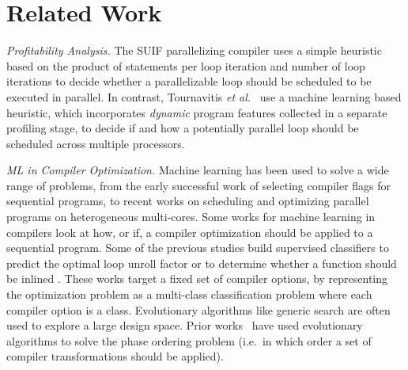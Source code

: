
\section{Related Work}
\label{related_work}


\textit{Profitability Analysis.}
The SUIF \cite{Wilson:1994:SIR:193209.193217} parallelizing compiler uses a simple heuristic based on the product of statements per loop iteration and number of loop iterations to decide whether a parallelizable loop should be scheduled to be executed in parallel. In contrast, Tournavitis \emph{et al.}~\cite{Tournavitis:2009:THA:1542476.1542496} use a machine learning based heuristic, which incorporates \textit{dynamic} program features collected in a separate profiling stage, to decide if and how a potentially parallel loop should be scheduled across multiple processors.

\textit{ML in Compiler Optimization.}
Machine learning has been used to solve a wide range of problems, from the early successful work of selecting compiler flags for sequential programs, to recent works on scheduling and optimizing parallel programs on heterogeneous multi-cores. Some works for machine learning in compilers look at how, or if, a compiler optimization should be applied to a sequential program. Some of the previous studies build supervised classifiers to predict the optimal loop unroll factor \cite{4907653,1402082} or to determine whether a function should be inlined \cite{Zhao2003ToIO,1559966}. These works target a fixed set of compiler options, by representing the optimization problem as a multi-class classification problem where each compiler option is a class. Evolutionary algorithms like generic search are often used to explore a large design space. Prior works~\cite{Almagor:2004:FEC:997163.997196,Cooper:2005:AAC:1065910.1065921,Ashouri:2017:MMC:3132652.3124452} have used evolutionary algorithms to solve the phase ordering problem (i.e.\ in which order a set of compiler transformations should be applied).

